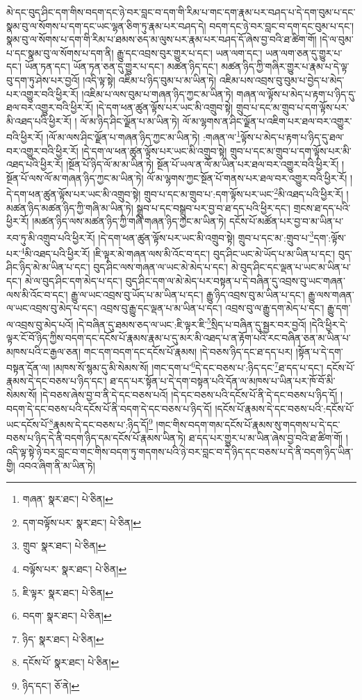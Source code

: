 མེ་དང་བུད་ཤིང་དག་གིས་བདག་དང་ཉེ་བར་བླང་བ་དག་གི་རིམ་པ་གང་དག་རྣམ་པར་བཤད་པ་དེ་དག་བུམ་པ་དང་སྣམ་བུ་ལ་སོགས་པ་དག་དང་ཡང་ལྷན་ཅིག་ཏུ་རྣམ་པར་བཤད་དེ། བདག་དང་ཉེ་བར་བླང་བ་དག་དང་བུམ་པ་དང་། སྣམ་བུ་ལ་སོགས་པ་དག་གི་རིམ་པ་ཐམས་ཅད་མ་ལུས་པར་རྣམ་པར་བཤད་དོ་ཞེས་བྱ་བའི་ཐ་ཚིག་གོ། །དེ་ལ་བུམ་པ་དང་སྣམ་བུ་ལ་སོགས་པ་དག་ནི། རྒྱུ་དང་འབྲས་བུར་གྱུར་པ་དང་། ཡན་ལག་དང་། ཡན་ལག་ཅན་དུ་གྱུར་པ་དང་། ཡོན་ཏན་དང་། ཡོན་ཏན་ཅན་དུ་གྱུར་པ་དང་། མཚན་ཉིད་དང་། མཚན་ཉིད་ཀྱི་གཞིར་གྱུར་པ་རྣམ་པ་དེ་ལྟ་བུ་དག་ཏུ་ཤེས་པར་བྱའོ། །འདི་ལྟ་སྟེ། འཇིམ་པ་ཉིད་བུམ་པ་མ་ཡིན་ཏེ། འཇིམ་པས་འབྲས་བུ་བུམ་པ་བྱེད་པ་མེད་པར་འགྱུར་བའི་ཕྱིར་རོ། །འཇིམ་པ་ལས་བུམ་པ་གཞན་ཉིད་ཀྱང་མ་ཡིན་ཏེ། གཞན་ལ་ལྟོས་པ་མེད་པ་རྟག་པ་ཉིད་དུ་ཐལ་བར་འགྱུར་བའི་ཕྱིར་རོ། །དེ་དག་ཕན་ཚུན་ལྟོས་པར་ཡང་མི་འགྲུབ་སྟེ། གྲུབ་པ་དང་མ་གྲུབ་པ་དག་ལྟོས་པར་མི་འཐད་པའི་ཕྱིར་རོ། །
ལོ་མ་ཉིད་ཤིང་ལྗོན་པ་མ་ཡིན་ཏེ། ལོ་མ་ལྷགས་ན་ཤིང་ལྗོན་པ་འཇིག་པར་ཐལ་བར་འགྱུར་བའི་ཕྱིར་རོ། །ལོ་མ་ལས་ཤིང་ལྗོན་པ་གཞན་ཉིད་ཀྱང་མ་ཡིན་ཏེ། :གཞན་ལ་\footnote{གཞན་  སྣར་ཐང་།  པེ་ཅིན། }ལྟོས་པ་མེད་པ་རྟག་པ་ཉིད་དུ་ཐལ་བར་འགྱུར་བའི་ཕྱིར་རོ། །དེ་དག་ལ་ཕན་ཚུན་ལྟོས་པར་ཡང་མི་འགྲུབ་སྟེ། གྲུབ་པ་དང་མ་གྲུབ་པ་དག་ལྟོས་པར་མི་འཐད་པའི་ཕྱིར་རོ། །སྔོན་པོ་ཉིད་ལོ་མ་མ་ཡིན་ཏེ། སྔོན་པོ་ཡལ་ན་ལོ་མ་ཡིན་པར་ཐལ་བར་འགྱུར་བའི་ཕྱིར་རོ། །སྔོན་པོ་ལས་ལོ་མ་གཞན་ཉིད་ཀྱང་མ་ཡིན་ཏེ། ལོ་མ་ལྷགས་ཀྱང་སྔོན་པོ་གནས་པར་ཐལ་བར་འགྱུར་བའི་ཕྱིར་རོ། །དེ་དག་ཕན་ཚུན་ལྟོས་པར་ཡང་མི་འགྲུབ་སྟེ། གྲུབ་པ་དང་མ་གྲུབ་པ་:དག་ལྟོས་པར་ཡང་\footnote{དག་བལྟོས་པར་  སྣར་ཐང་།  པེ་ཅིན། }མི་འཐད་པའི་ཕྱིར་རོ། །མཚན་ཉིད་མཚན་ཉིད་ཀྱི་གཞི་མ་ཡིན་ཏེ། སྒྲུབ་པ་དང་བསྒྲུབ་པར་བྱ་བ་ཐ་དད་པའི་ཕྱིར་དང་། གྲངས་ཐ་དད་པའི་ཕྱིར་རོ། །མཚན་ཉིད་ལས་མཚན་ཉིད་ཀྱི་གཞི་གཞན་ཉིད་ཀྱང་མ་ཡིན་ཏེ། དངོས་པོ་མཚོན་པར་བྱ་བ་མ་ཡིན་པ་རབ་ཏུ་མི་འགྲུབ་པའི་ཕྱིར་རོ། །དེ་དག་ཕན་ཚུན་ལྟོས་པར་ཡང་མི་འགྲུབ་སྟེ། གྲུབ་པ་དང་མ་:གྲུབ་པ་\footnote{གྲུབ་  སྣར་ཐང་།  པེ་ཅིན། }དག་:ལྟོས་པར་\footnote{བལྟོས་པར་  སྣར་ཐང་།  པེ་ཅིན། }མི་འཐད་པའི་ཕྱིར་རོ། །ཇི་ལྟར་མེ་གཞན་ལས་མི་འོང་བ་དང་། བུད་ཤིང་ཡང་མེ་ཡོད་པ་མ་ཡིན་པ་དང་། བུད་ཤིང་ཉིད་མེ་མ་ཡིན་པ་དང་། བུད་ཤིང་ལས་གཞན་ལ་ཡང་མེ་མེད་པ་དང་། མེ་བུད་ཤིང་དང་ལྡན་པ་ཡང་མ་ཡིན་པ་དང་། མེ་ལ་བུད་ཤིང་དག་མེད་པ་དང་། བུད་ཤིང་དག་ལ་མེ་མེད་པར་བསྟན་པ་དེ་བཞིན་དུ་འབྲས་བུ་ཡང་གཞན་ལས་མི་འོང་བ་དང་། རྒྱུ་ལ་ཡང་འབྲས་བུ་ཡོད་པ་མ་ཡིན་པ་དང་། རྒྱུ་ཉིད་འབྲས་བུ་མ་ཡིན་པ་དང་། རྒྱུ་ལས་གཞན་ལ་ཡང་འབྲས་བུ་མེད་པ་དང་། འབྲས་བུ་རྒྱུ་དང་ལྡན་པ་མ་ཡིན་པ་དང་། འབྲས་བུ་ལ་རྒྱུ་དག་མེད་པ་དང་། རྒྱུ་དག་ལ་འབྲས་བུ་མེད་པའོ། །དེ་བཞིན་དུ་ཐམས་ཅད་ལ་ཡང་:ཇི་ལྟར་ཇི་\footnote{ཇི་ལྟར་  སྣར་ཐང་།  པེ་ཅིན། }སྲིད་པ་བཞིན་དུ་སྦྱར་བར་བྱའོ། །དེའི་ཕྱིར་དེ་ལྟར་ངོ་བོ་ཉིད་ཀྱིས་བདག་དང་དངོས་པོ་རྣམས་རྣམ་པ་དུ་མར་མི་འཐད་པ་ན་རྟོག་པའི་རང་བཞིན་ཅན་མ་ཡིན་པ་མཁས་པའི་ང་རྒྱལ་ཅན། གང་དག་བདག་དང་དངོས་པོ་རྣམས། །དེ་བཅས་ཉིད་དང་ཐ་དད་པར། །སྟོན་པ་དེ་དག་བསྟན་དོན་ལ། །མཁས་སོ་སྙམ་དུ་མི་སེམས་སོ། །གང་དག་པ་\footnote{བདག་  སྣར་ཐང་།  པེ་ཅིན། }དེ་དང་བཅས་པ་:ཉིད་དང་\footnote{ཉིད་  སྣར་ཐང་།  པེ་ཅིན། }ཐ་དད་པ་དང་། དངོས་པོ་རྣམས་དེ་དང་བཅས་པ་ཉིད་དང་། ཐ་དད་པར་སྟོན་པ་དེ་དག་བསྟན་པའི་དོན་ལ་མཁས་པ་ཡིན་པར་ཁོ་བོ་མི་སེམས་སོ། །དེ་བཅས་ཞེས་བྱ་བ་ནི་དེ་དང་བཅས་པའོ། །དེ་དང་བཅས་པའི་དངོས་པོ་ནི་དེ་དང་བཅས་པ་ཉིད་དོ། །བདག་དེ་དང་བཅས་པའི་དངོས་པོ་ནི་བདག་དེ་དང་བཅས་པ་ཉིད་དོ། །དངོས་པོ་རྣམས་དེ་དང་བཅས་པའི་:དངོས་པོ་ཡང་དངོས་པོ་\footnote{དངོས་པོ་  སྣར་ཐང་།  པེ་ཅིན། }རྣམས་དེ་དང་བཅས་པ་:ཉིད་དོ།\footnote{ཉིད་དང་།  ཅོ་ནེ། } །གང་གིས་བདག་གམ་དངོས་པོ་རྣམས་སུ་གདགས་པ་དེ་དང་བཅས་པ་ཉིད་དེ་ནི་བདག་ཉིད་དམ་དངོས་པོ་རྣམས་ཡིན་ཏེ། ཐ་དད་པར་གྱུར་པ་མ་ཡིན་ཞེས་བྱ་བའི་ཐ་ཚིག་གོ། །འདི་ལྟ་སྟེ་ཉེ་བར་བླང་བ་གང་གིས་བདག་ཏུ་གདགས་པའི་ཉེ་བར་བླང་བ་དེ་ཉིད་དང་བཅས་པ་དེ་ནི་བདག་ཉིད་ཡིན་གྱི། འབའ་ཞིག་ནི་མ་ཡིན་ཏེ། 